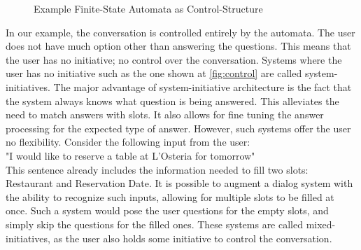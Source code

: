\usetikzlibrary{automata,positioning}
\begin{figure}[htbp]
  \centering
  \caption[Example Finite-State Automata as Control-Structure]{Example Finite-State Automata as Control-Structure}\label{fig:control}
\end{figure}

In our example, the conversation is controlled entirely by the automata.
The user does not have much option other than answering the questions.
This means that the user has no initiative; no control over the conversation.
Systems where the user has no initiative such as the one shown at \autoref{fig:control} are called system-initiatives.
The major advantage of system-initiative architecture is the fact that the system always knows what question is being answered.
This alleviates the need to match answers with slots.
It also allows for fine tuning the answer processing for the expected type of answer.
However, such systems offer the user no flexibility.
Consider the following input from the user:\\
"I would like to reserve a table at L'Osteria for tomorrow"\\
This sentence already includes the information needed to fill two slots: Restaurant and Reservation Date.
It is possible to augment a dialog system with the ability to recognize such inputs, allowing for multiple slots to be filled at once.
Such a system would pose the user questions for the empty slots, and simply skip the questions for the filled ones.
These systems are called mixed-initiatives, as the user also holds some initiative to control the conversation.
\newpage
